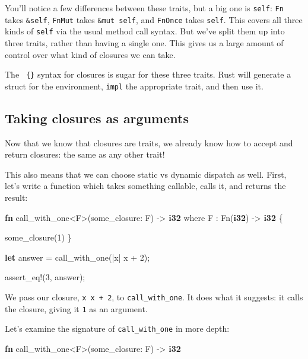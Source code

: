 \documentclass[a4paper,]{book}
\newenvironment{Shaded}{\begin{snugshade}}{\end{snugshade}}
\newcommand{\KeywordTok}[1]{\textcolor[rgb]{0.13,0.29,0.53}{\textbf{{#1}}}}
\newcommand{\DecValTok}[1]{\textcolor[rgb]{0.00,0.00,0.81}{{#1}}}
\newcommand{\OtherTok}[1]{\textcolor[rgb]{0.56,0.35,0.01}{{#1}}}
\newcommand{\NormalTok}[1]{{#1}}
\begin{document}
You'll notice a few differences between these traits, but a big one is
\texttt{self}: \texttt{Fn} takes \texttt{\&self}, \texttt{FnMut} takes
\texttt{\&mut\ self}, and \texttt{FnOnce} takes \texttt{self}. This
covers all three kinds of \texttt{self} via the usual method call
syntax. But we've split them up into three traits, rather than having a
single one. This gives us a large amount of control over what kind of
closures we can take.

The \texttt{\textbar{}\textbar{}\ \{\}} syntax for closures is sugar for
these three traits. Rust will generate a struct for the environment,
\texttt{impl} the appropriate trait, and then use it.

\subsection{Taking closures as
arguments}\label{taking-closures-as-arguments}

Now that we know that closures are traits, we already know how to accept
and return closures: the same as any other trait!

This also means that we can choose static vs dynamic dispatch as well.
First, let's write a function which takes something callable, calls it,
and returns the result:

\begin{Shaded}
\begin{Highlighting}[]
\KeywordTok{fn} \NormalTok{call_with_one<F>(some_closure: F) -> }\KeywordTok{i32}
    \NormalTok{where F : Fn(}\KeywordTok{i32}\NormalTok{) -> }\KeywordTok{i32} \NormalTok{\{}

    \NormalTok{some_closure(}\DecValTok{1}\NormalTok{)}
\NormalTok{\}}

\KeywordTok{let} \NormalTok{answer = call_with_one(|x| x + }\DecValTok{2}\NormalTok{);}

\OtherTok{assert_eq!}\NormalTok{(}\DecValTok{3}\NormalTok{, answer);}
\end{Highlighting}
\end{Shaded}

We pass our closure, \texttt{\textbar{}x\textbar{}\ x\ +\ 2}, to
\texttt{call\_with\_one}. It does what it suggests: it calls the
closure, giving it \texttt{1} as an argument.

Let's examine the signature of \texttt{call\_with\_one} in more depth:

\begin{Shaded}
\begin{Highlighting}[]
\KeywordTok{fn} \NormalTok{call_with_one<F>(some_closure: F) -> }\KeywordTok{i32}
\end{Highlighting}
\end{Shaded}
\end{document}
